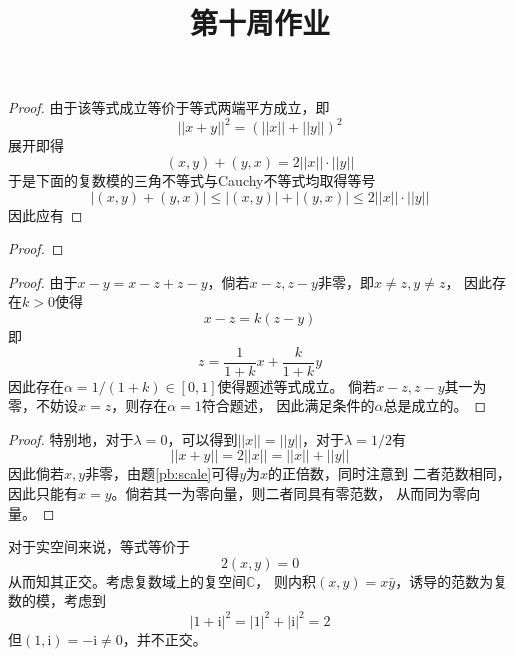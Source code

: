 \documentclass[cn]{homework}
\title{第十周作业}
\begin{document}
    \maketitle

    \problem
    \label{pb:scale}
    \begin{subproblem}[(\arabic*)]
        \item
        \begin{proof}
            由于该等式成立等价于等式两端平方成立，即
            \[||x+y||^2=(||x||+||y||)^2\]
            展开即得
            \[(x,y)+(y,x)=2||x||\cdot||y||\]
            于是下面的复数模的三角不等式与Cauchy不等式均取得等号
            \[|(x,y)+(y,x)|\leq|(x,y)|+|(y,x)|\leq 2||x||\cdot||y||\]
            因此应有

        \end{proof}

        \item
        \begin{proof}
        \end{proof}

        \item
        \begin{proof}
            由于$x-y=x-z+z-y$，倘若$x-z,z-y$非零，即$x\neq z,y\neq z$，
            因此存在$k>0$使得
            \[x-z=k(z-y)\]
            即
            \[z=\frac{1}{1+k}x+\frac{k}{1+k}y\]
            因此存在$\alpha=1/(1+k)\in[0,1]$使得题述等式成立。
            倘若$x-z,z-y$其一为零，不妨设$x=z$，则存在$\alpha=1$符合题述，
            因此满足条件的$\alpha$总是成立的。
        \end{proof}
    \end{subproblem}

    \problem
    \begin{proof}
        特别地，对于$\lambda=0$，可以得到$||x||=||y||$，对于$\lambda=1/2$有
        \[||x+y||=2||x||=||x||+||y||\]
        因此倘若$x,y$非零，由题\ref{pb:scale}可得$y$为$x$的正倍数，同时注意到
        二者范数相同，因此只能有$x=y$。倘若其一为零向量，则二者同具有零范数，
        从而同为零向量。

    \end{proof}

    \problem

    \problem
    对于实空间来说，等式等价于
    \[2(x,y)=0\]
    从而知其正交。考虑复数域上的复空间$\mathbb C$，
    则内积$(x,y)=x\bar y$，诱导的范数为复数的模，考虑到
    \newcommand{\img}{\mathrm i}
    \[|1+\img|^2=|1|^2+|\img|^2=2\]
    但$(1,\img)=-\img\neq 0$，并不正交。
\end{document}
